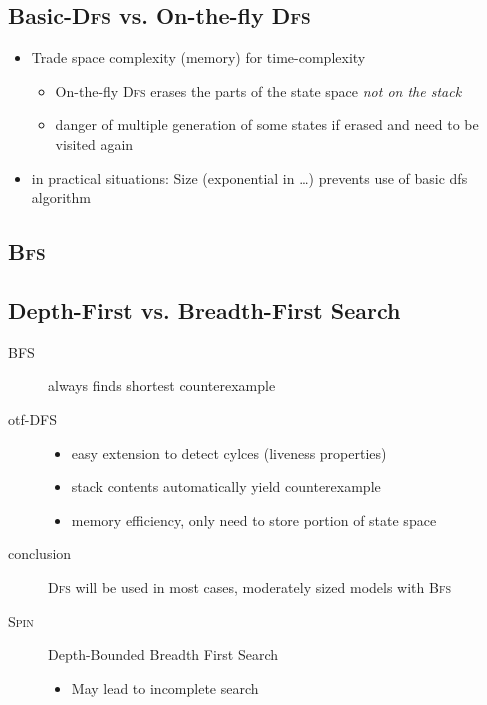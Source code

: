 \documentclass[a4paper, 10pt]{article}
\begin{document}
\subsection*{Basic-\textsc{Dfs} vs. On-the-fly \textsc{Dfs}}
\begin{itemize}
    \item Trade space complexity (memory) for time-complexity
    \begin{itemize}
        \item On-the-fly \textsc{Dfs} erases the parts of the state space \emph{not on the stack}
        \item danger of multiple generation of some states if erased and need to be visited again
    \end{itemize}
    \item in practical situations: Size (exponential in \dots) prevents use of basic dfs algorithm
\end{itemize}
\subsection*{\textsc{Bfs}}

\subsection*{Depth-First vs. Breadth-First Search}
\begin{description}
    \item[BFS] always finds shortest counterexample
    \item[otf-DFS]
    \begin{itemize}
        \item easy extension to detect cylces (liveness properties)
        \item stack contents automatically yield counterexample
        \item memory efficiency, only need to store portion of state space
    \end{itemize}
    \item[conclusion]\textsc{Dfs} will be used in most cases, moderately sized models with \textsc{Bfs}
    \item[\textsc{Spin}] Depth-Bounded Breadth First Search
    \begin{itemize}
        \item May lead to incomplete search
    \end{itemize}
\end{description}
\end{document}
